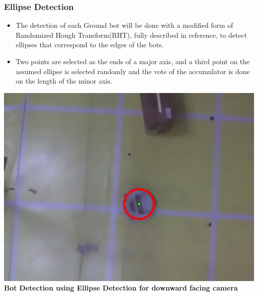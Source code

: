 \documentclass[12pt]{article}
\begin{document}
        \subsubsection{Ellipse Detection}
            \begin{itemize}
                \item The detection of each Ground bot will be done with a modified form of Randomized Hough Transform(RHT), fully described in reference, to detect ellipses that correspond to the edges of the bots. 
                \item Two points are selected as the ends of a major axis, and a third point on the assumed ellipse is selected randomly and the vote of the accumulator is done on the length of the minor axis.          
            \end{itemize}
    \begin{center}\includegraphics[scale=0.2]{Pic2} \\
    \textbf{Bot Detection using Ellipse Detection for downward facing camera}\end{center}
\end{document}
